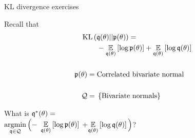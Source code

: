 \begin{frame}{KL divergence exercises}
\hspace{-3em}
\begin{minipage}{0.5\textwidth}
%
Recall that
\begin{align*}
%
\MoveEqLeft
\kl{\q(\theta)}{\p(\theta)} ={}\\&
-\expect{\q(\theta)}{\log \p(\theta)} +
\expect{\q(\theta)}{\log \q(\theta)}\\ \\
\p(\theta) ={}& \textrm{Correlated bivariate normal}\\ \\
\qdom ={}& \left\{ \textrm{Bivariate normals}\right\}
%
\end{align*}

What is $\mathfrak{q}^*(\theta) = $\\
$\underset{\mathfrak{q} \in \mathcal{Q}}{\mathrm{argmin}}\, \Big(-$
\sout{$\underset{\mathfrak{q}(\theta)}{\mathbb{E}}\left[\log \mathfrak{p}(\theta)\right]$}
$+ \underset{\mathfrak{q}(\theta)}{\mathbb{E}}\left[\log \mathfrak{q}(\theta)\right] \Big)$?
%
\end{minipage}
%
\begin{minipage}{0.4\textwidth}

\end{minipage}

\end{frame}

